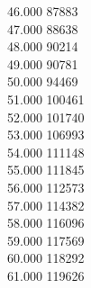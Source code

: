 { 46.000	87883 \\
 47.000	88638 \\
 48.000	90214 \\
 49.000	90781 \\
 50.000	94469 \\
 51.000	100461 \\
 52.000	101740 \\
 53.000	106993 \\
 54.000	111148 \\
 55.000	111845 \\
 56.000	112573 \\
 57.000	114382 \\
 58.000	116096 \\
 59.000	117569 \\
 60.000	118292 \\
 61.000	119626 \\
}
